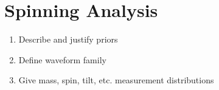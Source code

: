 \section{Spinning Analysis}

\begin{enumerate}
\item Describe and justify priors
\item Define waveform family
\item Give mass, spin, tilt, etc. measurement distributions
\end{enumerate}
